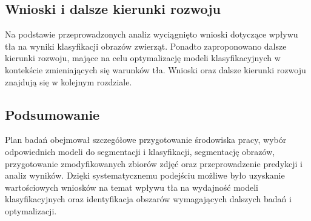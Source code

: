 \subsection*{Wnioski i dalsze kierunki rozwoju}

Na podstawie przeprowadzonych analiz wyciągnięto wnioski dotyczące wpływu tła na wyniki klasyfikacji 
obrazów zwierząt. Ponadto zaproponowano dalsze kierunki rozwoju, mające na celu optymalizację modeli 
klasyfikacyjnych w kontekście zmieniających się warunków tła. Wnioski oraz dalsze kierunki rozwoju 
znajdują się w kolejnym rozdziale. 

\subsection*{Podsumowanie}

Plan badań obejmował szczegółowe przygotowanie środowiska pracy, wybór odpowiednich modeli do segmentacji i klasyfikacji, segmentację obrazów, przygotowanie zmodyfikowanych zbiorów zdjęć oraz przeprowadzenie predykcji i analiz wyników. Dzięki systematycznemu podejściu możliwe było uzyskanie wartościowych wniosków na temat wpływu tła na wydajność modeli klasyfikacyjnych oraz identyfikacja obszarów wymagających dalszych badań i optymalizacji.

